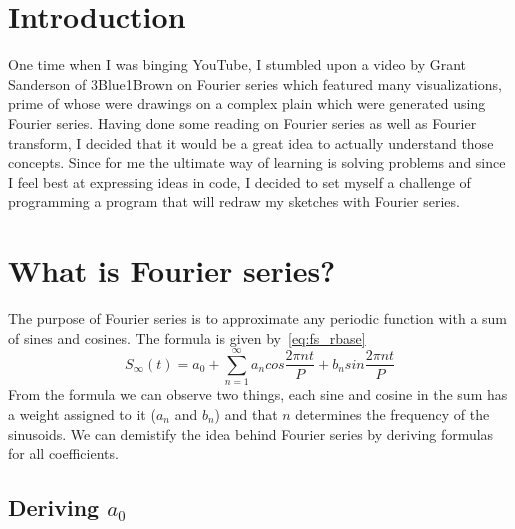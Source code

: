 \documentclass{article}
\begin{document}
\section{Introduction}

    One time when I was binging YouTube, I stumbled upon a video by Grant Sanderson
    of 3Blue1Brown on Fourier series which featured many visualizations, prime of
    whose were drawings on a complex plain which were generated using Fourier
    series. Having done some reading on Fourier series as well as Fourier transform, 
    I decided that it would be a great idea to actually understand those concepts.
    Since for me the ultimate way of learning is solving problems and since I feel
    best at expressing ideas in code, I decided to set myself a challenge of 
    programming a program that will redraw my sketches with Fourier series.


\section{What is Fourier series?}

    The purpose of Fourier series is to approximate any periodic function with
    a sum of sines and cosines. The formula is given by~\eqref{eq:fs_rbase}
    \begin{equation} \label{eq:fs_rbase}
        S_\infty(t) = a_0 + \sum_{n=1}^{\infty}a_ncos\frac{2\pi nt}{P} + b_n%
            sin\frac{2\pi nt}{P}
    \end{equation}
    From the formula we can observe two things, each sine and cosine in the sum
    has a weight assigned to it ($a_n$ and $b_n$) and that $n$ determines the 
    frequency of the sinusoids. We can demistify the idea behind Fourier series
    by deriving formulas for all coefficients.

\subsection{Deriving $a_0$}
    
\end{document}
